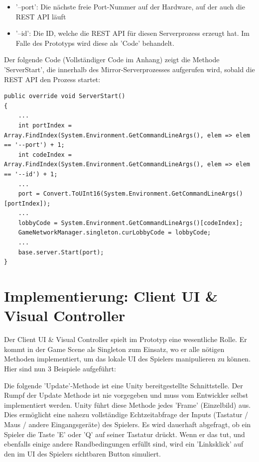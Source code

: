 \begin{itemize}
	\item '--port': Die nächste freie Port-Nummer auf der Hardware, auf der auch die REST API läuft
	\item '--id': Die ID, welche die REST API für diesen Serverprozess erzeugt hat. Im Falle des Prototyps wird diese als 'Code' behandelt.
\end{itemize}

Der folgende Code (Vollständiger Code im Anhang) zeigt die Methode 'ServerStart', die innerhalb des Mirror-Serverprozesses aufgerufen wird, sobald die REST API den Prozess startet: 

\begin{lstlisting}[caption= OwnKcpTransport.cs ServerStart()]
public override void ServerStart()
{
	...
	int portIndex = Array.FindIndex(System.Environment.GetCommandLineArgs(), elem => elem == '--port') + 1;
	int codeIndex = Array.FindIndex(System.Environment.GetCommandLineArgs(), elem => elem == '--id') + 1;
	...
	port = Convert.ToUInt16(System.Environment.GetCommandLineArgs()[portIndex]);
	...
	lobbyCode = System.Environment.GetCommandLineArgs()[codeIndex];
	GameNetworkManager.singleton.curLobbyCode = lobbyCode;
	...
	base.server.Start(port);
}
\end{lstlisting}


\section{Implementierung: Client UI \& Visual Controller}
\label{implementierung:client_UI_Controller}

Der Client UI \& Visual Controller spielt im Prototyp eine wesentliche Rolle. Er kommt in der Game Scene als Singleton \cite{M.Gatrell.2009} zum Einsatz, wo er alle nötigen Methoden implementiert, um das lokale UI des Spielers manipulieren zu können. Hier sind nun 3 Beispiele aufgeführt:

Die folgende 'Update'-Methode ist eine Unity bereitgestellte Schnittstelle. Der Rumpf der Update Methode ist nie vorgegeben und muss vom Entwickler selbst implementiert werden. Unity führt diese Methode jedes 'Frame' (Einzelbild) \cite{Wikipedia.2021j} aus. Dies ermöglicht eine nahezu vollständige Echtzeitabfrage der Inputs (Tastatur / Maus / andere Eingangsgeräte) des Spielers. Es wird dauerhaft abgefragt, ob ein Spieler die Taste 'E' oder 'Q' auf seiner Tastatur drückt. Wenn er das tut, und ebenfalls einige andere Randbedingungen erfüllt sind, wird ein 'Linksklick' auf den im UI des Spielers sichtbaren Button simuliert.

